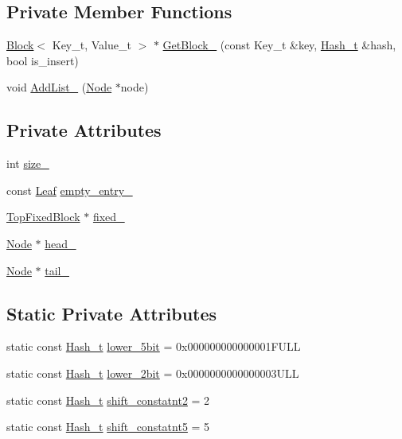 \subsection*{Private Member Functions}
\begin{DoxyCompactItemize}
\item 
\hyperlink{classmocha_1_1_block}{Block}$<$ Key\_\-t, Value\_\-t $>$ $\ast$ \hyperlink{classmocha_1_1_hash_table_a3c482eff8a9afb3651ffeb5a60c7c170}{GetBlock\_\-} (const Key\_\-t \&key, \hyperlink{namespacemocha_ac43feb383f32d7a0b18fc5866cf9ed5c}{Hash\_\-t} \&hash, bool is\_\-insert)
\item 
void \hyperlink{classmocha_1_1_hash_table_ae90cb7c71a4e9316495ca7c4d635fc10}{AddList\_\-} (\hyperlink{classmocha_1_1_block}{Node} $\ast$node)
\end{DoxyCompactItemize}
\subsection*{Private Attributes}
\begin{DoxyCompactItemize}
\item 
int \hyperlink{classmocha_1_1_hash_table_acfaea92a2c538b293ef7211b1018ef8e}{size\_\-}
\item 
const \hyperlink{classmocha_1_1_entry}{Leaf} \hyperlink{classmocha_1_1_hash_table_a1d1bc15084515db8f2cb0d792929214f}{empty\_\-entry\_\-}
\item 
\hyperlink{classmocha_1_1_block}{TopFixedBlock} $\ast$ \hyperlink{classmocha_1_1_hash_table_a6cbe7e08011b4a51fb42828709702e66}{fixed\_\-}
\item 
\hyperlink{classmocha_1_1_block}{Node} $\ast$ \hyperlink{classmocha_1_1_hash_table_a954f7023e83b9b52affc3655c67a450c}{head\_\-}
\item 
\hyperlink{classmocha_1_1_block}{Node} $\ast$ \hyperlink{classmocha_1_1_hash_table_a2a2427ab0f6c9e70b381e9915d3e64ef}{tail\_\-}
\end{DoxyCompactItemize}
\subsection*{Static Private Attributes}
\begin{DoxyCompactItemize}
\item 
static const \hyperlink{namespacemocha_ac43feb383f32d7a0b18fc5866cf9ed5c}{Hash\_\-t} \hyperlink{classmocha_1_1_hash_table_a33bcad6d78ecde63a8c9a7aeb60dc90f}{lower\_\-5bit} = 0x000000000000001FULL
\item 
static const \hyperlink{namespacemocha_ac43feb383f32d7a0b18fc5866cf9ed5c}{Hash\_\-t} \hyperlink{classmocha_1_1_hash_table_ae089c8e0a1e230fcd07895124e9af72a}{lower\_\-2bit} = 0x0000000000000003ULL
\item 
static const \hyperlink{namespacemocha_ac43feb383f32d7a0b18fc5866cf9ed5c}{Hash\_\-t} \hyperlink{classmocha_1_1_hash_table_ae452418e6b4593739a896b9de14e200f}{shift\_\-constatnt2} = 2
\item 
static const \hyperlink{namespacemocha_ac43feb383f32d7a0b18fc5866cf9ed5c}{Hash\_\-t} \hyperlink{classmocha_1_1_hash_table_a0c9f14cc6a29009848ff5e22ff5c77ae}{shift\_\-constatnt5} = 5
\end{DoxyCompactItemize}


